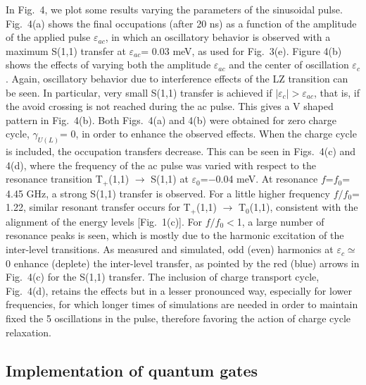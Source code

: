 \documentclass[prb,twocolumn,showpacs,floats]{revtex4}
\begin{document}
In Fig.~4, we plot some results varying the parameters of the sinusoidal pulse. Fig.~4(a) shows the final
occupations (after 20 ns) as a function of the amplitude of the applied pulse $\varepsilon_{ac}$, in which
an oscillatory behavior is observed with a maximum S(1,1) transfer at $\varepsilon_{ac}$= 0.03 meV, 
as used for Fig.~3(e). Figure 4(b) shows the effects of varying both the amplitude $\varepsilon_{ac}$
and the center of oscillation $\varepsilon_{c}$. Again, oscillatory behavior due to interference effects
of the LZ transition can be seen. In particular, very small S(1,1) transfer is achieved if 
$|\varepsilon_{c}| > \varepsilon_{ac}$, that is, if the avoid crossing is not reached during the ac pulse. This
gives a V shaped pattern in Fig.~4(b). Both Figs.~4(a) and 4(b) were obtained for zero
charge cycle, $\gamma_{U(L)}$= 0, in order to enhance the observed effects.
When the charge cycle is included, the occupation transfers decrease. This can be seen
in Figs.~4(c) and 4(d), where the frequency of the ac pulse was varied with respect
to the resonance transition T$_+$(1,1) $\rightarrow$ S(1,1) at $\varepsilon_0$=$-$0.04 meV.
At resonance $f$=$f_0$= 4.45 GHz, a strong S(1,1) transfer is observed. For a little higher frequency 
$f/f_0$= 1.22, similar resonant transfer occurs for T$_+$(1,1) $\rightarrow$ T$_0$(1,1), consistent
with the alignment of the energy levels [Fig.~1(c)]. For  $f/f_0 <$1, a large number of resonance peaks
is seen, which is mostly due to the harmonic excitation of the inter-level transitions. As
measured\cite{petta-prl} and simulated,\cite{rudner, petta-prb} odd (even) harmonics at $\varepsilon_c \simeq$0
enhance (deplete) the inter-level transfer, as pointed by the red (blue) arrows in Fig.~4(c)
for the S(1,1) transfer.
The inclusion of charge transport cycle, Fig.~4(d), retains the effects but in a lesser pronounced way, especially
for lower frequencies, for which longer times of simulations are needed
in order to maintain fixed the 5 oscillations in the pulse,
therefore favoring the action of charge cycle relaxation.



\subsection{Implementation of quantum gates}
\end{document}
